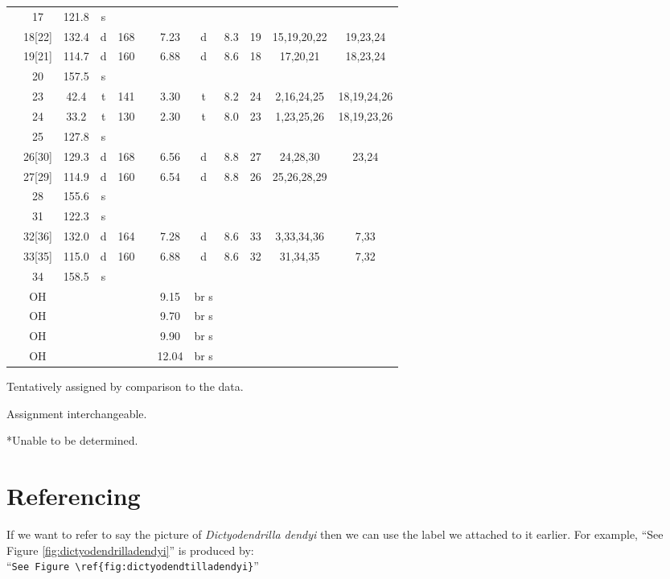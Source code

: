 \begin{sidewaystable}
\begin{center}
\begin{threeparttable}[c]
\begin{tabular}{c c ccc c ccc ccc}
& 17 & 121.8\tnote{\ddag} & s & & & & & & & & \\
& 18[22] & 132.4 & d & 168 & & 7.23 & d & 8.3 & 19 & 15,19,20,22 & 19,23,24\\
& 19[21] & 114.7 & d & 160 & & 6.88 & d & 8.6 & 18 & 17,20,21 & 18,23,24\\
& 20 & 157.5 & s & & & & & & & & \\
& 23 & 42.4 & t & 141 & & 3.30 & t & 8.2 & 24 & 2,16,24,25 & 18,19,24,26\\
& 24 & 33.2 & t & 130 & & 2.30 & t & 8.0 & 23 & 1,23,25,26 & 18,19,23,26\\
& 25 & 127.8 & s & & & & & & & & \\
& 26[30] & 129.3 & d & 168 & & 6.56 & d & 8.8 & 27 & 24,28,30 & 23,24\\
& 27[29] & 114.9 & d & 160 & & 6.54 & d & 8.8 & 26 & 25,26,28,29 & \\
& 28 & 155.6 & s & & & & & & & & \\
& 31 & 122.3\tnote{\ddag} & s & & & & & & & & \\
& 32[36] & 132.0 & d & 164 & & 7.28 & d & 8.6 & 33 & 3,33,34,36 & 7,33\\
& 33[35] & 115.0 & d & 160 & & 6.88 & d & 8.6 & 32 & 31,34,35 & 7,32\\
& 34 & 158.5 & s & & & & & & & & \\
& OH & & & & & 9.15 & br s & & & & \\
& OH & & & & & 9.70 & br s & & & & \\
& OH & & & & & 9.90 & br s & & & & \\
& OH & & & & & 12.04 & br s & & & & \\
\cline{2-12}
\end{tabular}
\begin{tablenotes}
\item{\dag}{Tentatively assigned by comparison to the  data.}
\item{\ddag}{Assignment interchangeable.}
\item{*}{Unable to be determined.}
\end{tablenotes}
\end{threeparttable}
\end{center}
\end{sidewaystable}

\section{Referencing}

If we want to refer to say the picture of \emph{Dictyodendrilla dendyi} then we can use the label we attached to it earlier.  For example, ``See Figure \ref{fig:dictyodendrilladendyi}'' is produced by:\\
``\small\verb$See Figure \ref{fig:dictyodendtilladendyi}$\normalsize''

